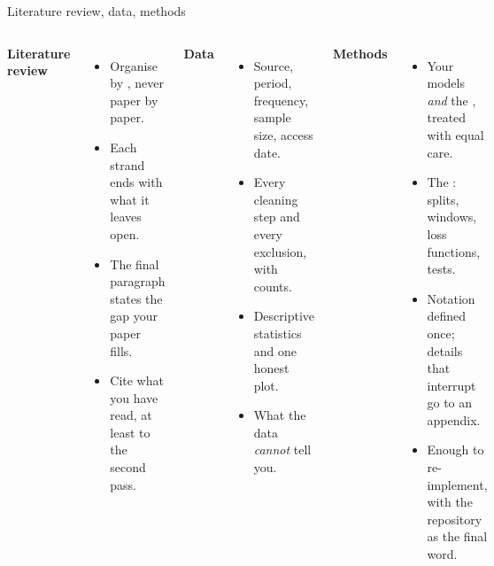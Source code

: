 \documentclass[aspectratio=169,11pt,t]{beamer}
\begin{document}
\begin{frame}{Literature review, data, methods}
  \begin{columns}[T,onlytextwidth]
    \textbf{Literature review}
    \begin{itemize}\small
      \item Organise by , never paper by paper.
      \item Each strand ends with what it leaves open.
      \item The final paragraph states the gap your paper fills.
      \item Cite what you have read, at least to the second pass.
    \end{itemize}
    \textbf{Data}
    \begin{itemize}\small
      \item Source, period, frequency, sample size, access date.
      \item Every cleaning step and every exclusion, with counts.
      \item Descriptive statistics and one honest plot.
      \item What the data \emph{cannot} tell you.
    \end{itemize}
    \textbf{Methods}
    \begin{itemize}\small
      \item Your models \emph{and} the , treated with equal care.
      \item The : splits, windows, loss functions, tests.
      \item Notation defined once; details that interrupt go to an appendix.
      \item Enough to re-implement, with the repository as the final word.
    \end{itemize}
  \end{columns}
\end{frame}
\end{document}
